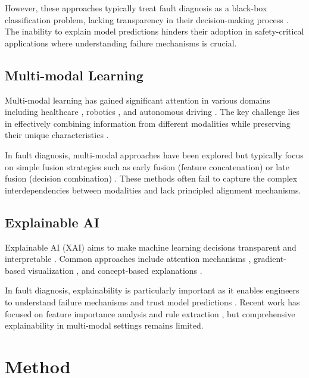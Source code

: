 \documentclass[journal]{IEEEtran}
\begin{document}
However, these approaches typically treat fault diagnosis as a black-box classification problem, lacking transparency in their decision-making process \cite{adi2018physical}. The inability to explain model predictions hinders their adoption in safety-critical applications where understanding failure mechanisms is crucial.

\subsection{Multi-modal Learning}

Multi-modal learning has gained significant attention in various domains including healthcare \cite{shen2017multimodal}, robotics \cite{le2018multimodal}, and autonomous driving \cite{chen2020multimodal}. The key challenge lies in effectively combining information from different modalities while preserving their unique characteristics \cite{baltrusaitis2019multimodal}.

In fault diagnosis, multi-modal approaches have been explored but typically focus on simple fusion strategies such as early fusion (feature concatenation) or late fusion (decision combination) \cite{zhao2021multi}. These methods often fail to capture the complex interdependencies between modalities and lack principled alignment mechanisms.

\subsection{Explainable AI}

Explainable AI (XAI) aims to make machine learning decisions transparent and interpretable \cite{guidotti2018survey}. Common approaches include attention mechanisms \cite{bahdanau2014neural}, gradient-based visualization \cite{selvaraju2017grad}, and concept-based explanations \cite{kim2018interpretability}.

In fault diagnosis, explainability is particularly important as it enables engineers to understand failure mechanisms and trust model predictions \cite{zhang2022explainable}. Recent work has focused on feature importance analysis \cite{li2021explainable} and rule extraction \cite{wang2022rule}, but comprehensive explainability in multi-modal settings remains limited.

\section{Method}
\end{document}
